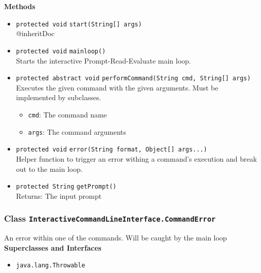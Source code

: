 \textbf{Methods}
\begin{itemize}
\item \lstinline|protected void| \lstinline|start|\lstinline|(String[] args)|\\
{@inheritDoc}



\item \lstinline|protected void| \lstinline|mainloop|\lstinline|()|\\
Starts the interactive Prompt-Read-Evaluate main loop.



\item \lstinline|protected abstract void| \lstinline|performCommand|\lstinline|(String cmd, String[] args)|\\
Executes the given command with the given arguments. Must be implemented by subclasses.
\begin{itemize}
\item \lstinline|cmd|: The command name
\item \lstinline|args|: The command arguments
\end{itemize}



\item \lstinline|protected void| \lstinline|error|\lstinline|(String format, Object[] args...)|\\
Helper function to trigger an error withing a command's execution and break out to
 the main loop.



\item \lstinline|protected String| \lstinline|getPrompt|\lstinline|()|\\
Returns: The input prompt



\end{itemize}

\subsubsection{Class \lstinline|InteractiveCommandLineInterface.CommandError|}
An error within one of the commands. Will be caught by the main loop \\


\textbf{Superclasses and Interfaces}
\begin{itemize}
\item \lstinline|java.lang.Throwable|
\end{itemize}




